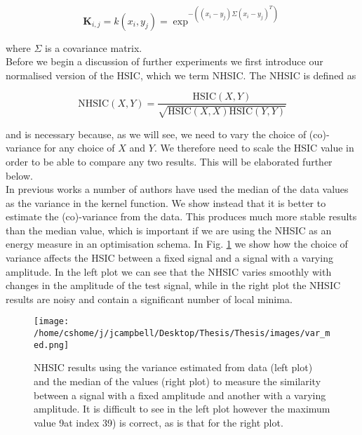 \begin{equation}
\textbf{K}_{i,j} = k(x_i,y_j) = \exp^{-((x_i-y_j)\Sigma(x_i-y_j)^T)}
\end{equation}

\noindent where $\Sigma$ is a covariance matrix.\\

Before we begin a discussion of further experiments we first introduce our normalised version of the HSIC, which we term NHSIC. The NHSIC is defined as 

\begin{equation}
\text{NHSIC}(X,Y) = \frac{\text{HSIC}(X,Y)}{\sqrt{\text{HSIC}(X,X)\text{HSIC}(Y,Y)}}
\end{equation}

\noindent and is necessary because, as we will see, we need to vary the choice of (co)-variance for any choice of $X$ and $Y$. We therefore need to scale the HSIC value in order to be able to compare any two results. This will be elaborated further below. \\

In previous works a number of authors have used the median of the data values as the variance in the kernel function. We show instead that it is better to estimate the (co)-variance from the data. This produces much more stable results than the median value, which is important if we are using the NHSIC as an energy measure in an optimisation schema. In Fig. \ref{var_med} we show how the choice of variance affects the HSIC between a fixed signal and a signal with a varying amplitude. In the left plot we can see that the NHSIC varies smoothly with changes in the amplitude of the test signal, while in the right plot the NHSIC results are noisy and contain a significant number of local minima.\\

\begin{figure}[h]
\texttt{[image: /home/cshome/j/jcampbell/Desktop/Thesis/Thesis/images/var\_med.png]}
\caption{NHSIC results using the variance estimated from data (left plot) and the median of the values (right plot) to measure the similarity between a signal with a fixed amplitude and another with a varying amplitude. It is difficult to see in the left plot however the maximum value 9at index 39) is correct, as is that for the right plot.  \label{var_med}}
\end{figure}

